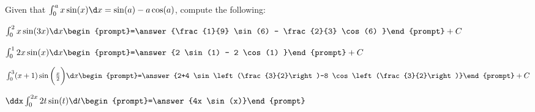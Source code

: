 \documentclass{ximera}
\author{Jim Talamo}
\begin{document}
\begin{exercise}
Given that $ \int_0^a x \sin(x) \d x = \sin(a)-a \cos(a)$, compute the following:



$ \int_0^2 x \sin(3x) \d x \begin{prompt}=\answer{\frac{1}{9} \sin(6) - \frac{2}{3} \cos(6) }\end{prompt}+C$


$ \int_0^1 2x \sin(x) \d x \begin{prompt}=\answer{2 \sin(1) - 2 \cos(1) }\end{prompt}+C$

$ \int_0^3 (x+1) \sin\bigg(\frac{x}{2}\bigg) \d x \begin{prompt}=\answer{2+4 \sin\left(\frac{3}{2}\right)-8 \cos\left(\frac{3}{2}\right)}\end{prompt}+C$

$\ddx  \int_0^{2x} 2t \sin(t) \d t  \begin{prompt}=\answer{4x \sin(x)}\end{prompt}$

\end{exercise}
\end{document}
